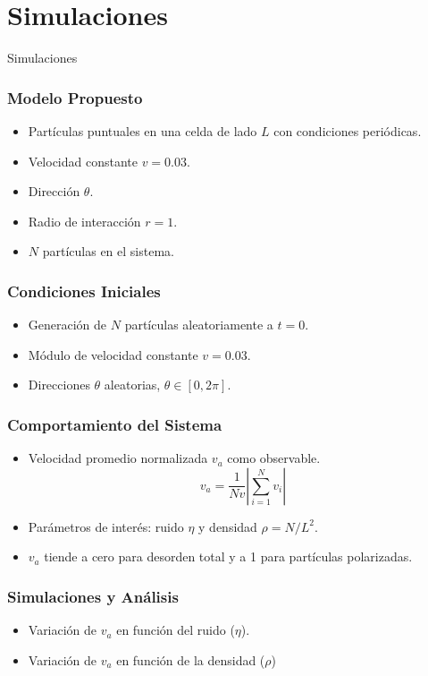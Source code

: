 \section{Simulaciones}

{
\begin{frame}
    \centering
  \Huge
  Simulaciones
\end{frame}
}

\begin{frame}
\frametitle{Modelo Propuesto}
\begin{itemize}
    \item Partículas puntuales en una celda de lado \(L\) con condiciones periódicas.
    \item Velocidad constante \(v = 0.03\).
    \item Dirección \(\theta\).
    \item Radio de interacción \(r = 1\).
    \item \(N\) partículas en el sistema.
\end{itemize}
\end{frame}

\begin{frame}
\frametitle{Condiciones Iniciales}
\begin{itemize}
    \item Generación de \(N\) partículas aleatoriamente a \(t = 0\).
    \item Módulo de velocidad constante \(v = 0.03\).
    \item Direcciones \(\theta\) aleatorias, \(\theta \in [0, 2\pi]\).
\end{itemize}
\end{frame}

\begin{frame}
\frametitle{Comportamiento del Sistema}
\begin{itemize}
    \item Velocidad promedio normalizada \(v_a\) como observable.
    \[    v_a = \frac{1}{Nv} \left| \sum^{N}_{i=1} v_i \right|
\]
    \item Parámetros de interés: ruido \(\eta\) y densidad \(\rho = N / L^2\).
    \item \(v_a\) tiende a cero para desorden total y a 1 para partículas polarizadas.
\end{itemize}
\end{frame}

\begin{frame}
\frametitle{Simulaciones y Análisis}
\begin{itemize}
    \item Variación de \(v_a\) en función del ruido (\(\eta\)).
        \item Variación de \(v_a\) en función de la densidad (\(\rho\))
\end{itemize}
\end{frame}


